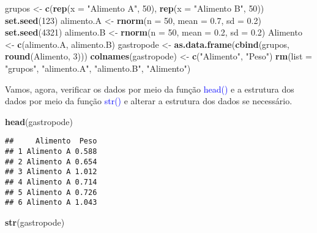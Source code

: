 \documentclass[14pt,titlepage, oneside, openany, a4paper]{book}
\newenvironment{Shaded}{\begin{snugshade}}{\end{snugshade}}
\newcommand{\DataTypeTok}[1]{\textcolor[rgb]{0.13,0.29,0.53}{#1}}
\newcommand{\DecValTok}[1]{\textcolor[rgb]{0.00,0.00,0.81}{#1}}
\newcommand{\FloatTok}[1]{\textcolor[rgb]{0.00,0.00,0.81}{#1}}
\newcommand{\KeywordTok}[1]{\textcolor[rgb]{0.13,0.29,0.53}{\textbf{#1}}}
\newcommand{\NormalTok}[1]{#1}
\newcommand{\StringTok}[1]{\textcolor[rgb]{0.31,0.60,0.02}{#1}}
\begin{document}
\begin{Shaded}
\begin{Highlighting}[]
\NormalTok{grupos <-}\StringTok{ }\KeywordTok{c}\NormalTok{(}\KeywordTok{rep}\NormalTok{(}\DataTypeTok{x =} \StringTok{"Alimento A"}\NormalTok{, }\DecValTok{50}\NormalTok{), }\KeywordTok{rep}\NormalTok{(}\DataTypeTok{x =} \StringTok{"Alimento B"}\NormalTok{, }\DecValTok{50}\NormalTok{))}
\KeywordTok{set.seed}\NormalTok{(}\DecValTok{123}\NormalTok{)}
\NormalTok{alimento.A <-}\StringTok{ }\KeywordTok{rnorm}\NormalTok{(}\DataTypeTok{n =} \DecValTok{50}\NormalTok{, }\DataTypeTok{mean =} \FloatTok{0.7}\NormalTok{, }\DataTypeTok{sd =} \FloatTok{0.2}\NormalTok{)}
\KeywordTok{set.seed}\NormalTok{(}\DecValTok{4321}\NormalTok{)}
\NormalTok{alimento.B <-}\StringTok{ }\KeywordTok{rnorm}\NormalTok{(}\DataTypeTok{n =} \DecValTok{50}\NormalTok{, }\DataTypeTok{mean =} \FloatTok{0.2}\NormalTok{, }\DataTypeTok{sd =} \FloatTok{0.2}\NormalTok{)}
\NormalTok{Alimento <-}\StringTok{ }\KeywordTok{c}\NormalTok{(alimento.A, alimento.B)}
\NormalTok{gastropode <-}\StringTok{ }\KeywordTok{as.data.frame}\NormalTok{(}\KeywordTok{cbind}\NormalTok{(grupos, }\KeywordTok{round}\NormalTok{(Alimento, }\DecValTok{3}\NormalTok{)))}
\KeywordTok{colnames}\NormalTok{(gastropode) <-}\StringTok{ }\KeywordTok{c}\NormalTok{(}\StringTok{"Alimento"}\NormalTok{, }\StringTok{"Peso"}\NormalTok{)}
\KeywordTok{rm}\NormalTok{(}\DataTypeTok{list =} \StringTok{"grupos"}\NormalTok{, }\StringTok{"alimento.A"}\NormalTok{, }\StringTok{"alimento.B"}\NormalTok{, }\StringTok{"Alimento"}\NormalTok{)}
\end{Highlighting}
\end{Shaded}

Vamos, agora, verificar os dados por meio da função \textcolor{blue}{head()} e a estrutura dos dados por meio da função \textcolor{blue}{str()} e alterar a estrutura dos dados se necessário.

\begin{Shaded}
\begin{Highlighting}[]
\KeywordTok{head}\NormalTok{(gastropode)}
\end{Highlighting}
\end{Shaded}

\begin{verbatim}
##     Alimento  Peso
## 1 Alimento A 0.588
## 2 Alimento A 0.654
## 3 Alimento A 1.012
## 4 Alimento A 0.714
## 5 Alimento A 0.726
## 6 Alimento A 1.043
\end{verbatim}

\begin{Shaded}
\begin{Highlighting}[]
\KeywordTok{str}\NormalTok{(gastropode)}
\end{Highlighting}
\end{Shaded}
\end{document}
